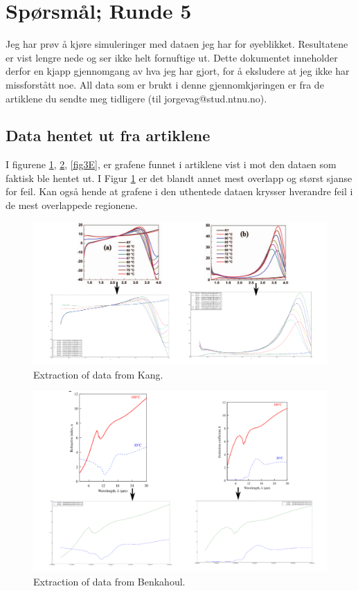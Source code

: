 \section{Spørsmål; Runde 5}
Jeg har prøv å kjøre simuleringer med dataen jeg har for øyeblikket. Resultatene er vist 
lengre nede og ser ikke helt fornuftige ut. Dette dokumentet inneholder derfor
en kjapp gjennomgang av hva jeg har gjort, for å eksludere at jeg ikke har missforstått noe.
All data som er brukt i denne gjennomkjøringen er fra de artiklene du sendte meg tidligere
(til jorgevag@stud.ntnu.no).

\subsection{Data hentet ut fra artiklene}
I figurene 
\ref{fig1E},
\ref{fig2E},
\ref{fig3E},
er grafene funnet i artiklene vist i mot den dataen som faktisk ble hentet ut. I Figur
\ref{fig1E}
er det blandt annet mest overlapp og størst sjanse for feil. Kan også hende at
grafene i den uthentede dataen krysser hverandre feil i de mest overlappede regionene.
\newpage
%
\begin{figure}[h!] 
\centering 
\includegraphics[width=1.0\textwidth]{Figures/KangExtraction.png} 
\caption{Extraction of data from Kang.}
\label{fig1E}
\end{figure}
%
\begin{figure}[h!] 
\centering 
\includegraphics[width=1.0\textwidth]{Figures/BenkahoulExtraction.png} 
\caption{Extraction of data from Benkahoul.}
\label{fig2E}
\end{figure}
